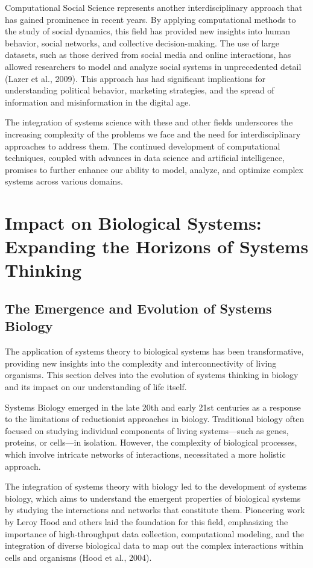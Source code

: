 \documentclass[twocolumn]{article}
\begin{document}
\textcolor{primary}{Computational Social Science represents another interdisciplinary approach that has gained prominence in recent years. By applying computational methods to the study of social dynamics, this field has provided new insights into human behavior, social networks, and collective decision-making. The use of large datasets, such as those derived from social media and online interactions, has allowed researchers to model and analyze social systems in unprecedented detail (Lazer et al., 2009). This approach has had significant implications for understanding political behavior, marketing strategies, and the spread of information and misinformation in the digital age.}

\textcolor{secondary}{The integration of systems science with these and other fields underscores the increasing complexity of the problems we face and the need for interdisciplinary approaches to address them. The continued development of computational techniques, coupled with advances in data science and artificial intelligence, promises to further enhance our ability to model, analyze, and optimize complex systems across various domains.}

\section{Impact on Biological Systems: Expanding the Horizons of Systems Thinking}

\subsection{The Emergence and Evolution of Systems Biology}

\textcolor{primary}{The application of systems theory to biological systems has been transformative, providing new insights into the complexity and interconnectivity of living organisms. This section delves into the evolution of systems thinking in biology and its impact on our understanding of life itself.}


\textcolor{secondary}{Systems Biology emerged in the late 20th and early 21st centuries as a response to the limitations of reductionist approaches in biology. Traditional biology often focused on studying individual components of living systems—such as genes, proteins, or cells—in isolation. However, the complexity of biological processes, which involve intricate networks of interactions, necessitated a more holistic approach.}

\textcolor{primary}{The integration of systems theory with biology led to the development of systems biology, which aims to understand the emergent properties of biological systems by studying the interactions and networks that constitute them. Pioneering work by Leroy Hood and others laid the foundation for this field, emphasizing the importance of high-throughput data collection, computational modeling, and the integration of diverse biological data to map out the complex interactions within cells and organisms (Hood et al., 2004).}
\end{document}
